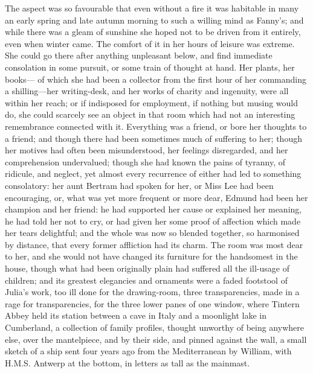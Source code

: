 \documentclass{article}
\begin{document}
The aspect was so favourable that even without a fire
it was habitable in many an early spring and late
autumn morning to such a willing mind as Fanny's;
and while there was a gleam of sunshine she hoped not
to be driven from it entirely, even when winter came.
The comfort of it in her hours of leisure was extreme.
She could go there after anything unpleasant below,
and find immediate consolation in some pursuit,
or some train of thought at hand.  Her plants, her books---%
of which she had been a collector from the first hour
of her commanding a shilling---her writing-desk, and her
works of charity and ingenuity, were all within her reach;
or if indisposed for employment, if nothing but musing
would do, she could scarcely see an object in that room
which had not an interesting remembrance connected with it.
Everything was a friend, or bore her thoughts to a friend;
and though there had been sometimes much of suffering
to her; though her motives had often been misunderstood,
her feelings disregarded, and her comprehension undervalued;
though she had known the pains of tyranny, of ridicule,
and neglect, yet almost every recurrence of either had led
to something consolatory:  her aunt Bertram had spoken
for her, or Miss Lee had been encouraging, or, what was yet
more frequent or more dear, Edmund had been her champion
and her friend:  he had supported her cause or explained
her meaning, he had told her not to cry, or had given her
some proof of affection which made her tears delightful;
and the whole was now so blended together, so harmonised
by distance, that every former affliction had its charm.
The room was most dear to her, and she would not have
changed its furniture for the handsomest in the house,
though what had been originally plain had suffered all
the ill-usage of children; and its greatest elegancies
and ornaments were a faded footstool of Julia's work,
too ill done for the drawing-room, three transparencies,
made in a rage for transparencies, for the three lower
panes of one window, where Tintern Abbey held its station
between a cave in Italy and a moonlight lake in Cumberland,
a collection of family profiles, thought unworthy of being
anywhere else, over the mantelpiece, and by their side,
and pinned against the wall, a small sketch of a ship
sent four years ago from the Mediterranean by William,
with H.M.S. Antwerp at the bottom, in letters as tall as the
mainmast.
\end{document}
